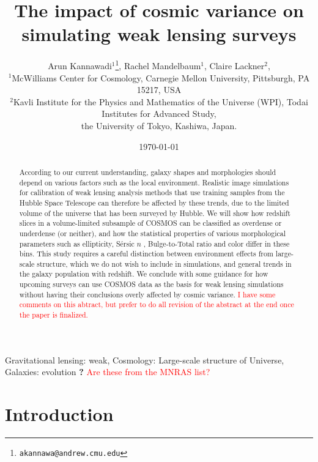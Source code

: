 \documentclass[twocolumn,useAMS,usenatbib]{mn2e}
\title[WL simulation]{The impact of cosmic variance on simulating weak lensing surveys}
\author[Kannawadi et al.]
{Arun Kannawadi$^1$\thanks{\tt akannawa@andrew.cmu.edu}, 
Rachel Mandelbaum$^1$,
Claire Lackner$^2$, 
\\$^1$McWilliams Center for Cosmology, Carnegie Mellon University, Pittsburgh, PA 15217, USA
\\$^2$Kavli Institute for the Physics and Mathematics of the Universe (WPI), Todai Institutes for Advanced Study,\\ the University of Tokyo, Kashiwa, Japan.
}
\date{\today}
\newcommand{\rachel}[1]{{\textcolor{red}{#1}}}
\newcommand{\sersicn}{S\'{e}rsic $n$ }
\newcommand{\btt}{Bulge-to-Total }
\begin{document}

\maketitle

\begin{abstract}
According to our current understanding, galaxy shapes and morphologies should depend on various factors such as the local environment. Realistic image simulations for calibration of weak lensing analysis methods that use training samples from the Hubble Space Telescope can therefore be affected by these trends, due to the limited volume of the universe that has been surveyed by Hubble. We will show how redshift slices in a volume-limited subsample of COSMOS can be classified as overdense or underdense (or neither), and how the statistical properties of various morphological parameters such as ellipticity, \sersicn, \btt ratio and color differ in these bins. This study requires a careful distinction between environment effects from large-scale structure, which we do not wish to include in simulations, and general trends in the galaxy population with redshift. We conclude with some guidance for how upcoming surveys can use COSMOS data as the basis for weak lensing simulations without having their conclusions overly affected by cosmic variance.  
\rachel{I have some comments on this abtract, but prefer to do all
  revision of the abstract at the end once the paper is finalized.}
\end{abstract}

\begin{keywords}
 Gravitational lensing: weak, Cosmology: Large-scale structure of Universe, Galaxies: evolution {\bf ?} \rachel{Are these from the MNRAS list?}
\end{keywords}

\section{Introduction}
\label{S:intro}
\end{document}
